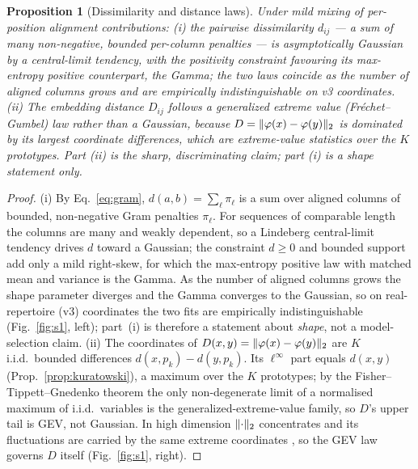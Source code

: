 \documentclass[11pt]{article}
\theoremstyle{oldplain}
\newtheorem{proposition}{Proposition}
\theoremstyle{oldrem}
\DeclarePairedDelimiter{\norm}{\lVert}{\rVert}
\begin{document}
\begin{proposition}[Dissimilarity and distance laws]\label{prop:laws}
Under mild mixing of per-position alignment contributions: (i) the pairwise dissimilarity $d_{ij}$ ---
a sum of many non-negative, bounded per-column penalties --- is asymptotically \emph{Gaussian} by a
central-limit tendency, with the positivity constraint favouring its max-entropy positive counterpart,
the Gamma; the two laws coincide as the number of aligned columns grows and are empirically
indistinguishable on v3 coordinates. (ii) The embedding distance $D_{ij}$ follows a generalized extreme
value (Fr\'echet--Gumbel) law rather than a Gaussian, because $D=\norm{\varphi(x)-\varphi(y)}_2$ is
dominated by its largest coordinate differences, which are extreme-value statistics over the $K$
prototypes. Part (ii) is the sharp, discriminating claim; part (i) is a shape statement only.
\end{proposition}
\begin{proof}
(i) By Eq.~\eqref{eq:gram}, $d(a,b)=\sum_\ell \pi_\ell$ is a sum over aligned columns of bounded, non-negative
Gram penalties $\pi_\ell$. For sequences of comparable length the columns are many and weakly dependent, so a
Lindeberg central-limit tendency drives $d$ toward a Gaussian; the constraint $d\ge0$ and bounded support
add only a mild right-skew, for which the max-entropy positive law with matched mean and variance is the
Gamma. As the number of aligned columns grows the shape parameter diverges and the Gamma converges to the
Gaussian, so on real-repertoire (v3) coordinates the two fits are empirically indistinguishable
(Fig.~\ref{fig:s1}, left); part~(i) is therefore a statement about \emph{shape}, not a model-selection
claim. (ii) The
coordinates of $D(x,y)=\norm{\varphi(x)-\varphi(y)}_2$ are $K$ i.i.d.\ bounded differences
$d(x,p_k)-d(y,p_k)$. Its $\ell^\infty$ part equals $d(x,y)$ (Prop.~\ref{prop:kuratowski}), a maximum over the
$K$ prototypes; by the Fisher--Tippett--Gnedenko theorem \cite{deHaanFerreira2006} the only non-degenerate
limit of a normalised maximum of i.i.d.\ variables is the generalized-extreme-value family, so $D$'s upper
tail is {\scshape GEV}, not Gaussian. In high dimension $\norm{\cdot}_2$ concentrates and its fluctuations are
carried by the same extreme coordinates \cite{Beyer1999}, so the {\scshape GEV} law governs $D$ itself
(Fig.~\ref{fig:s1}, right).
\end{proof}
\end{document}
